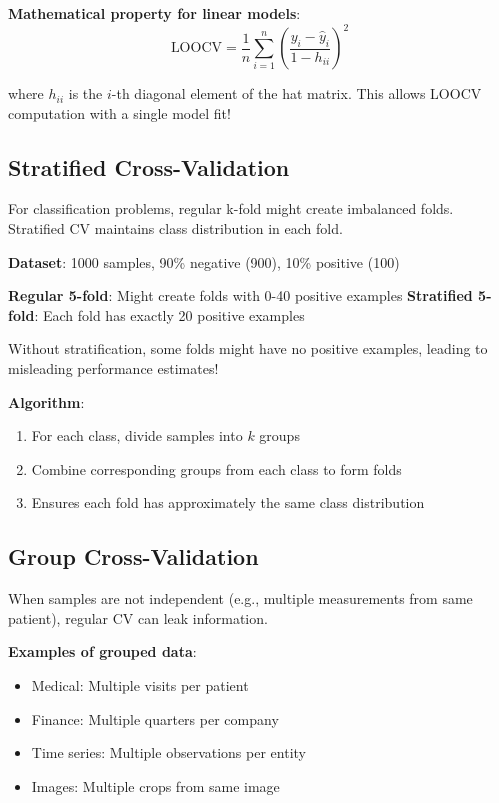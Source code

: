 \documentclass{article}
\newcounter{example}
\begin{document}
\textbf{Mathematical property for linear models}:
$$\text{LOOCV} = \frac{1}{n} \sum_{i=1}^n \left(\frac{y_i - \hat{y}_i}{1 - h_{ii}}\right)^2$$

where $h_{ii}$ is the $i$-th diagonal element of the hat matrix. This allows LOOCV computation with a single model fit!

\subsection{Stratified Cross-Validation}

For classification problems, regular k-fold might create imbalanced folds. Stratified CV maintains class distribution in each fold.

\begin{tcolorbox}[colback=green!5!white,colframe=green!75!black,title=Example \stepcounter{example}\#\theexample: Why Stratification Matters]

\textbf{Dataset}: 1000 samples, 90\% negative (900), 10\% positive (100)

\textbf{Regular 5-fold}: Might create folds with 0-40 positive examples
\textbf{Stratified 5-fold}: Each fold has exactly 20 positive examples

Without stratification, some folds might have no positive examples, leading to misleading performance estimates!
\end{tcolorbox}

\textbf{Algorithm}:
\begin{enumerate}
    \item For each class, divide samples into $k$ groups
    \item Combine corresponding groups from each class to form folds
    \item Ensures each fold has approximately the same class distribution
\end{enumerate}

\subsection{Group Cross-Validation}

When samples are not independent (e.g., multiple measurements from same patient), regular CV can leak information.

\textbf{Examples of grouped data}:
\begin{itemize}
    \item Medical: Multiple visits per patient
    \item Finance: Multiple quarters per company  
    \item Time series: Multiple observations per entity
    \item Images: Multiple crops from same image
\end{itemize}
\end{document}
